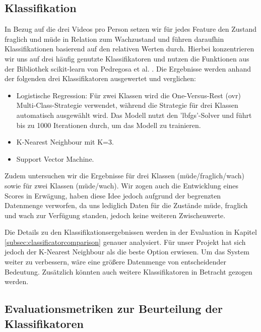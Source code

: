 \subsection{Klassifikation}
\label{sec:classification}

In Bezug auf die drei Videos pro Person setzen wir für jedes Feature den Zustand \glqq fraglich\grqq{} und \glqq müde\grqq{} in Relation zum Wachzustand und führen daraufhin Klassifikationen basierend auf den relativen Werten durch. Hierbei konzentrieren wir uns auf drei häufig genutzte Klassifikatoren und nutzen die Funktionen aus der Bibliothek scikit-learn von Pedregosa et al. \cite{PE11}. Die Ergebnisse werden anhand der folgenden drei Klassifikatoren ausgewertet und verglichen:

\begin{itemize}
\item Logistische Regression: Für zwei Klassen wird die \glqq One-Versus-Rest\grqq{} (ovr) Multi-Class-Strategie verwendet, während die Strategie für drei Klassen automatisch ausgewählt wird. Das Modell nutzt den 'lbfgs'-Solver und führt bis zu 1000 Iterationen durch, um das Modell zu trainieren.
\item K-Nearest Neighbour mit K=3.
\item Support Vector Machine.
\end{itemize}

Zudem untersuchen wir die Ergebnisse für drei Klassen (müde/fraglich/wach) sowie für zwei Klassen (müde/wach). Wir zogen auch die Entwicklung eines Scores in Erwägung, haben diese Idee jedoch aufgrund der begrenzten Datenmenge verworfen, da uns lediglich Daten für die Zustände \glqq müde\grqq{}, \glqq fraglich\grqq{} und \glqq wach\grqq{} zur Verfügung standen, jedoch keine weiteren Zwischenwerte.

Die Details zu den Klassifikationsergebnissen werden in der Evaluation in Kapitel \ref{subsec:classificatorcomparison} genauer analysiert. Für unser Projekt hat sich jedoch der K-Nearest Neighbour als die beste Option erwiesen. Um das System weiter zu verbessern, wäre eine größere Datenmenge von entscheidender Bedeutung. Zusätzlich könnten auch weitere Klassifikatoren in Betracht gezogen werden.

\subsection{Evaluationsmetriken zur Beurteilung der Klassifikatoren}
\label{sec:classificationmetrics}

